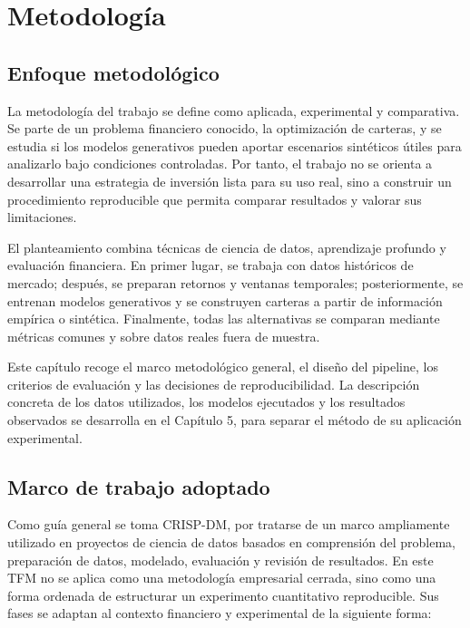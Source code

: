 \documentclass[11pt,a4paper,spanish,oneside]{book}
\numberwithin{equation}{chapter}
\numberwithin{figure}{chapter}
\begin{document}
\chapter{Metodología}

\section{Enfoque metodológico}

La metodología del trabajo se define como aplicada, experimental y comparativa. Se parte de un problema financiero conocido, la optimización de carteras, y se estudia si los modelos generativos pueden aportar escenarios sintéticos útiles para analizarlo bajo condiciones controladas. Por tanto, el trabajo no se orienta a desarrollar una estrategia de inversión lista para su uso real, sino a construir un procedimiento reproducible que permita comparar resultados y valorar sus limitaciones.

El planteamiento combina técnicas de ciencia de datos, aprendizaje profundo y evaluación financiera. En primer lugar, se trabaja con datos históricos de mercado; después, se preparan retornos y ventanas temporales; posteriormente, se entrenan modelos generativos y se construyen carteras a partir de información empírica o sintética. Finalmente, todas las alternativas se comparan mediante métricas comunes y sobre datos reales fuera de muestra.

Este capítulo recoge el marco metodológico general, el diseño del pipeline, los criterios de evaluación y las decisiones de reproducibilidad. La descripción concreta de los datos utilizados, los modelos ejecutados y los resultados observados se desarrolla en el Capítulo 5, para separar el método de su aplicación experimental.

\section{Marco de trabajo adoptado}

Como guía general se toma CRISP-DM, por tratarse de un marco ampliamente utilizado en proyectos de ciencia de datos basados en comprensión del problema, preparación de datos, modelado, evaluación y revisión de resultados. En este TFM no se aplica como una metodología empresarial cerrada, sino como una forma ordenada de estructurar un experimento cuantitativo reproducible. Sus fases se adaptan al contexto financiero y experimental de la siguiente forma:
\end{document}
